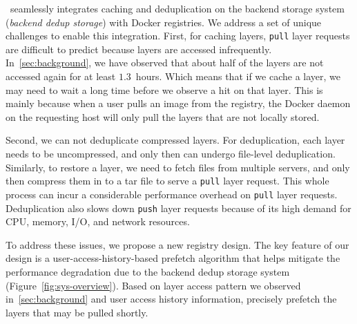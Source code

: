 \sysname~seamlessly integrates 
caching and deduplication on the
backend storage system (\emph{backend dedup storage}) with Docker registries.
%
We address a set of unique challenges to enable this integration.
%
First, for caching layers, \texttt{pull} layer requests are difficult to
predict because layers are accessed infrequently.
In~\cref{sec:background},
we have observed that about half of the layers are not
accessed again for at least $1.3$~hours. Which means that if we
cache a layer, we may need to wait a long time before we observe a hit on that layer.  %
This is mainly 
because when a user pulls an image from the registry, the Docker daemon on the
requesting host will only pull the layers that are not locally stored.
%

Second, we can not deduplicate compressed layers. For deduplication, each layer
needs to be uncompressed, and only then can undergo file-level deduplication. Similarly,
to restore a layer, we need to fetch files from multiple servers, and only then compress
them in to a tar file to serve a \texttt{pull} layer request. 
This whole process can incur a 
considerable performance overhead on \texttt{pull} layer requests.
Deduplication also slows down
\texttt{push} layer requests because of its high demand for CPU, memory, I/O, and network resources.

To address these issues, we propose a new registry design. The key feature of our design is a user-access-history-based prefetch algorithm that helps mitigate the performance degradation due to the 
backend dedup storage system (Figure~\ref{fig:sys-overview}). Based
on layer access pattern we observed in~\cref{sec:background} and user access history information,
\sysname precisely prefetch the layers that may be pulled shortly.

